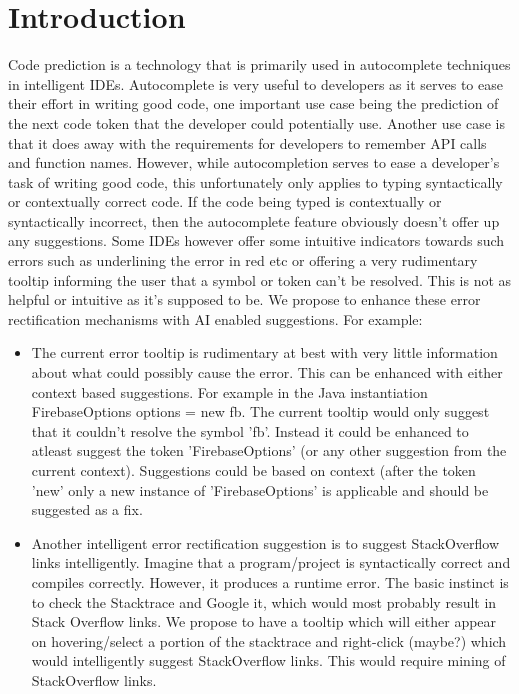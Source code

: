 \documentclass[sigplan,screen,9pt]{acmart}
\begin{document}
    \section{Introduction}
    Code prediction is a technology that is primarily used in autocomplete techniques in intelligent IDEs. Autocomplete is very useful to developers as it serves to ease their effort in writing good code, one important use case being the prediction of the next code token that the developer could potentially use. Another use case is that it does away with the requirements for developers to remember API calls and function names.\cite{FeedTree}
    \newline
    However, while autocompletion serves to ease a developer's task of writing good code, this unfortunately only applies to typing syntactically or contextually correct code. If the code being typed is contextually or syntactically incorrect, then the autocomplete feature obviously doesn't offer up any suggestions. Some IDEs however offer some intuitive indicators towards such errors such as underlining the error in red etc or offering a very rudimentary tooltip informing the user that a symbol or token can't be resolved. This is not as helpful or intuitive as it's supposed to be.
    \newline
    We propose to enhance these error rectification mechanisms with AI enabled suggestions. For example:
    \begin{itemize}
        \item The current error tooltip is rudimentary at best with very little information about what could possibly cause the error. This can be enhanced with either context based suggestions. For example in the Java instantiation FirebaseOptions options = new fb. The current tooltip would only suggest that it couldn't resolve the symbol 'fb'. Instead it could be enhanced to atleast suggest the token 'FirebaseOptions' (or any other suggestion from the current context). Suggestions could be based on context (after the token 'new' only a new instance of 'FirebaseOptions' is applicable and should be suggested as a fix.
        \item Another intelligent error rectification suggestion is to suggest StackOverflow links intelligently. Imagine that a program/project is syntactically correct and compiles correctly. However, it produces a runtime error. The basic instinct is to check the Stacktrace and Google it, which would most probably result in Stack Overflow links. We propose to have a tooltip which will either appear on hovering/select a portion of the stacktrace and right-click (maybe?) which would intelligently suggest StackOverflow links. This would require mining of StackOverflow links.
    \end{itemize}
\end{document}

